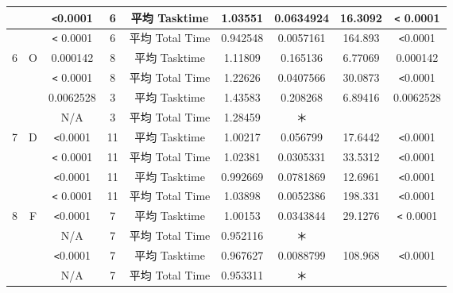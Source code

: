\begin{table}[ht]
\begin{center}
\begin{tabular}{|c|c|c|c|c|c|c|c|c|}
 &  &\verb|<|0.0001 & 6 & 平均 Tasktime & 1.03551 & 0.0634924 & 16.3092 & \verb|<| 0.0001 \\\hline
 &  & \verb|<| 0.0001 & 6 & 平均 Total Time & 0.942548 & 0.0057161 & 164.893 & \verb|<|0.0001 \\\hline
6 & O & 0.000142 & 8 & 平均 Tasktime & 1.11809 & 0.165136 & 6.77069 & 0.000142 \\\hline
 &  & \verb|<| 0.0001 & 8 & 平均 Total Time & 1.22626 & 0.0407566 & 30.0873 & \verb|<|0.0001 \\\hline
 &  & 0.0062528 & 3 & 平均 Tasktime & 1.43583 & 0.208268 & 6.89416 & 0.0062528 \\\hline
 &  & N/A & 3 & 平均 Total Time & 1.28459 & ＊ &  & \\\hline
7 & D & \verb|<|0.0001 & 11 & 平均 Tasktime & 1.00217 & 0.056799 & 17.6442 & \verb|<|0.0001\\\hline
 &  & \verb|<| 0.0001 & 11 & 平均 Total Time & 1.02381 & 0.0305331 & 33.5312 & \verb|<|0.0001\\\hline
 &  &\verb|<|0.0001 & 11 & 平均 Tasktime & 0.992669 & 0.0781869 & 12.6961 & \verb|<|0.0001\\\hline
 &  & \verb|<| 0.0001 & 11 & 平均 Total Time & 1.03898 & 0.0052386 & 198.331 & \verb|<|0.0001 \\\hline
8 & F & \verb|<|0.0001 & 7 & 平均 Tasktime & 1.00153 & 0.0343844 & 29.1276 & \verb|<| 0.0001 \\\hline
 &  & N/A & 7 & 平均 Total Time & 0.952116 & ＊ &  & \\\hline
 &  & \verb|<|0.0001 & 7 & 平均 Tasktime & 0.967627 & 0.0088799 & 108.968 &\verb|<|0.0001 \\\hline
 &  & N/A & 7 & 平均 Total Time & 0.953311 & ＊ &  & \\\hline
\end{tabular}
  \label{tb:test4}
\end{center}
\end{table}

